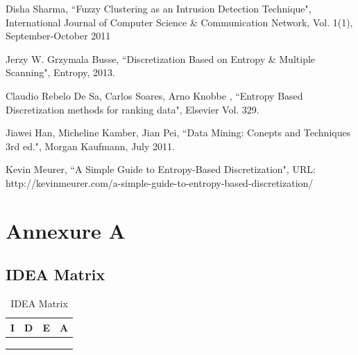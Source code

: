 \documentclass[12pt,a4paper,final]{report}
\DeclareRobustCommand{\gobblefive}[5]{}
\newcommand*{\SkipTocEntry}{\addtocontents{toc}{\gobblefive}}
\begin{document}
\begin{thebibliography}{9}
Disha Sharma, 
``Fuzzy Clustering as an Intrusion Detection Technique",
International Journal of Computer Science \& Communication Network, Vol. 1(1),
September-October 2011

Jerzy W. Grzymala Busse, 
``Discretization Based on Entropy \& Multiple Scanning", 
Entropy,
2013.

Claudio Rebelo De Sa, Carlos Soares, Arno Knobbe , 
``Entropy Based Discretization methods for ranking data", 
Elsevier Vol. 329.

Jiawei Han, Micheline Kamber, Jian Pei, 
``Data Mining: Conepts and Techniques 3rd ed.", 
Morgan Kaufmann, 
July 2011.

Kevin Meurer, 
``A Simple Guide to Entropy-Based Discretization", 
URL: http://kevinmeurer.com/a-simple-guide-to-entropy-based-discretization/
\end{thebibliography}
\endgroup
\newpage

\SkipTocEntry\chapter{Annexure A}
\thispagestyle{empty}
\newpage
\SkipTocEntry\section{IDEA Matrix}
\begin{table}[h]
\caption{IDEA Matrix}

\begin{center}
\begin{tabular}{|>{\bf}M{2.5cm}||>{\bf}M{2.5cm}||>{\bf}M{2.5cm}||>{\bf}M{2.5cm}|}
\hline
{}
I & D & E & A \\ \hline
{} &   &  &  \\ \hline
{} &   &  &  \\ \hline
{} &   &  &  \\ \hline
\end{tabular}
\end{center}
\end{table}
\end{document}
